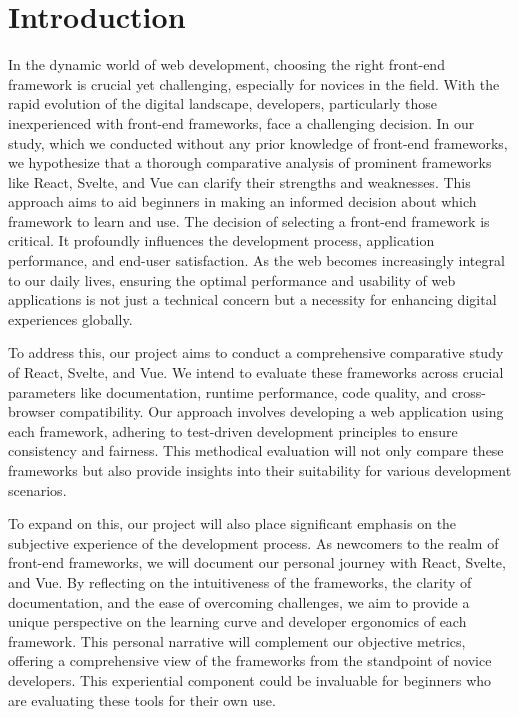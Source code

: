 \section{Introduction}

In the dynamic world of web development, choosing the right front-end framework is crucial yet challenging, especially for novices in the field. With the rapid evolution of the digital landscape, developers, particularly those inexperienced with front-end frameworks, face a challenging decision. In our study, which we conducted without any prior knowledge of front-end frameworks, we hypothesize that a thorough comparative analysis of prominent frameworks like React, Svelte, and Vue can clarify their strengths and weaknesses. This approach aims to aid beginners in making an informed decision about which framework to learn and use.
The decision of selecting a front-end framework is critical. It profoundly influences the development process, application performance, and end-user satisfaction. As the web becomes increasingly integral to our daily lives, ensuring the optimal performance and usability of web applications is not just a technical concern but a necessity for enhancing digital experiences globally.

To address this, our project aims to conduct a comprehensive comparative study of React, Svelte, and Vue. We intend to evaluate these frameworks across crucial parameters like documentation, runtime performance, code quality, and cross-browser compatibility. Our approach involves developing a web application using each framework, adhering to test-driven development principles to ensure consistency and fairness. This methodical evaluation will not only compare these frameworks but also provide insights into their suitability for various development scenarios. 

To expand on this, our project will also place significant emphasis on the subjective experience of the development process. As newcomers to the realm of front-end frameworks, we will document our personal journey with React, Svelte, and Vue. By reflecting on the intuitiveness of the frameworks, the clarity of documentation, and the ease of overcoming challenges, we aim to provide a unique perspective on the learning curve and developer ergonomics of each framework. This personal narrative will complement our objective metrics, offering a comprehensive view of the frameworks from the standpoint of novice developers. This experiential component could be invaluable for beginners who are evaluating these tools for their own use.
